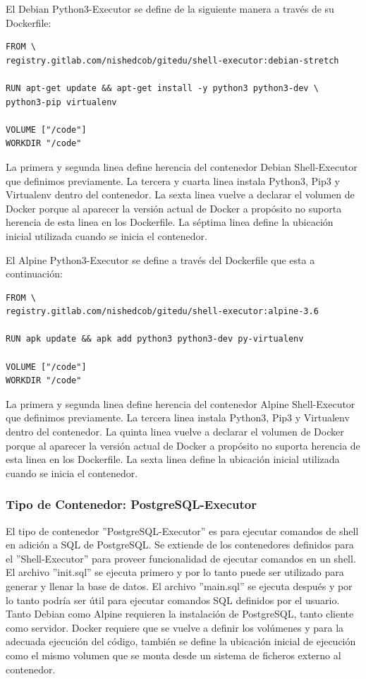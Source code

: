 El Debian Python3-Executor se define de la siguiente manera a través de su Dockerfile:
\begin{lstlisting}
FROM \
registry.gitlab.com/nishedcob/gitedu/shell-executor:debian-stretch

RUN apt-get update && apt-get install -y python3 python3-dev \
python3-pip virtualenv

VOLUME ["/code"]
WORKDIR "/code"
\end{lstlisting}
La primera y segunda linea define herencia del contenedor Debian Shell-Executor que definimos previamente. La tercera y cuarta linea instala Python3, Pip3 y Virtualenv dentro del contenedor. La sexta linea vuelve a declarar el volumen de Docker porque al aparecer la versión actual de Docker a propósito no suporta herencia de esta linea en los Dockerfile. La séptima linea define la ubicación inicial utilizada cuando se inicia el contenedor.

El Alpine Python3-Executor se define a través del Dockerfile que esta a continuación:
\begin{lstlisting}
FROM \
registry.gitlab.com/nishedcob/gitedu/shell-executor:alpine-3.6

RUN apk update && apk add python3 python3-dev py-virtualenv

VOLUME ["/code"]
WORKDIR "/code"
\end{lstlisting}
La primera y segunda linea define herencia del contenedor Alpine Shell-Executor que definimos previamente. La tercera linea instala Python3, Pip3 y Virtualenv dentro del contenedor. La quinta linea vuelve a declarar el volumen de Docker porque al aparecer la versión actual de Docker a propósito no suporta herencia de esta linea en los Dockerfile. La sexta linea define la ubicación inicial utilizada cuando se inicia el contenedor.

\subsubsection{Tipo de Contenedor: PostgreSQL-Executor}
El tipo de contenedor ''PostgreSQL-Executor'' es para ejecutar comandos de shell en adición a SQL de PostgreSQL. Se extiende de los contenedores definidos para el ''Shell-Executor'' para proveer funcionalidad de ejecutar comandos en un shell. El archivo ''init.sql'' se ejecuta primero y por lo tanto puede ser utilizado para generar y llenar la base de datos. El archivo ''main.sql'' se ejecuta después y por lo tanto podría ser útil para ejecutar comandos SQL definidos por el usuario. Tanto Debian como Alpine requieren la instalación de PostgreSQL, tanto cliente como servidor. Docker requiere que se vuelve a definir los volúmenes y para la adecuada ejecución del código, también se define la ubicación inicial de ejecución como el mismo volumen que se monta desde un sistema de ficheros externo al contenedor.

